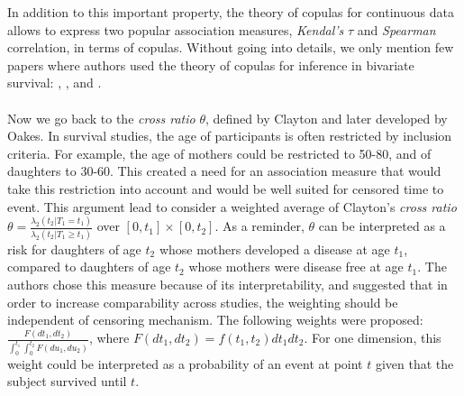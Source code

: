 \documentclass[]{article}
\begin{document}
In addition to this important property, the theory of copulas for continuous data allows to express two popular association measures, \emph{Kendal's} $\tau$ and \emph{Spearman} correlation, in terms of copulas. Without going into details, we only mention few papers where authors used the theory of copulas for inference in bivariate survival: \cite{shih1996tests}, \cite{shih1995inferences}, and \cite{zhang2008inference}.\\
~\\
Now we go back to the \emph{cross ratio} $\theta$, defined by Clayton and later developed by Oakes. In survival studies, the age of participants is often restricted by inclusion criteria. For example, the age of mothers could be restricted to 50-80, and of daughters to 30-60. This created a need for an association measure that would take this restriction into account and would be well suited for censored time to event. This argument lead \cite{fan2000dependence} to consider a weighted average of Clayton's \textit{cross ratio} $\theta = \frac{ \lambda_2(t_2|T_1=t_1)}{\lambda_2(t_2|T_1 \geq t_1)}$ over $[0,t_1] \times [0, t_2]$. As a reminder, $\theta$ can be interpreted as a risk for daughters of age $t_2$ whose mothers developed a disease at age $t_1$, compared to daughters of age $t_2$ whose mothers were disease free at age $t_1$. The authors chose this measure because of its interpretability, and suggested that in order to increase comparability across studies, the weighting should be independent of censoring mechanism. The following weights were proposed: $\frac{F(dt_1,dt_2)}{\int_0^{t_1}\int_0^{t_2} F(du_1, du_2)}$, where $F(dt_1,dt_2) = f(t_1,t_2)dt_1dt_2 $. For one dimension, this weight could be interpreted as a probability of an event at point $t$ given that the subject survived until $t$.\\
\end{document}
